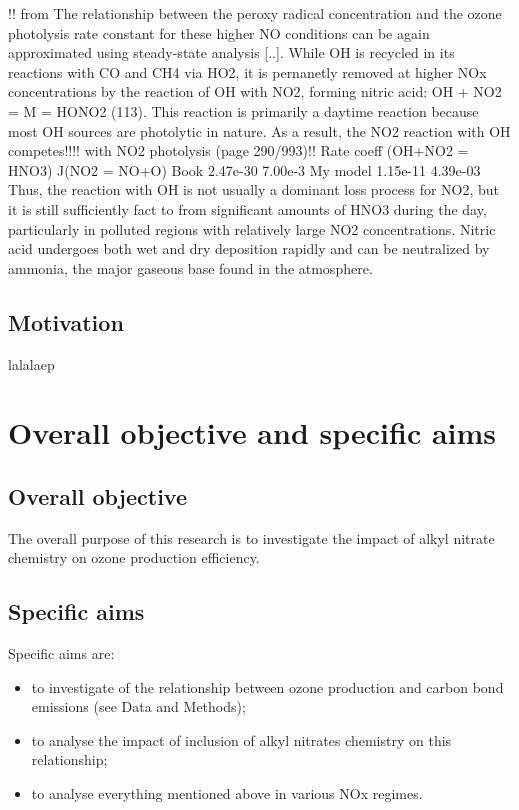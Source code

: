 \documentclass[11pt,a4paper]{article}
\begin{document}
!! from \citep{Finlayson-Pitts2000}
The relationship between the peroxy radical concentration and the ozone photolysis rate constant for these higher NO conditions can be again approximated using steady-state analysis [..]. While OH is recycled in its reactions with CO and CH4 via HO2, it is pernanetly removed at higher NOx concentrations by the reaction of OH with NO2, forming nitric acid:
OH + NO2 = M = HONO2 (113).
This reaction is primarily a daytime reaction because most OH sources are photolytic in nature. As a result, the NO2 reaction with OH competes!!!! with NO2 photolysis (page 290/993)!!
         Rate coeff (OH+NO2 = HNO3)  J(NO2 = NO+O)
Book     2.47e-30          7.00e-3
My model 1.15e-11          4.39e-03
Thus, the reaction with OH is not usually a dominant loss process for NO2, but it is still sufficiently fact to from significant amounts of HNO3 during the day, particularly in polluted regions with relatively large NO2 concentrations.
Nitric acid undergoes both wet and dry deposition rapidly and can be neutralized by ammonia, the major gaseous base found in the atmosphere.

\subsection{Motivation}
lalalaep

\section{Overall objective and specific aims}
\subsection{Overall objective}
The overall purpose of this research is to investigate the impact of alkyl nitrate chemistry on ozone production efficiency.
\subsection{Specific aims}
Specific aims are:
\begin{itemize}
\item to investigate of the relationship between ozone production and carbon bond emissions (see Data and Methods);
\item to analyse the impact of inclusion of alkyl nitrates chemistry on this relationship;
\item to analyse everything mentioned above in various NOx regimes.
\end{itemize}
\end{document}
